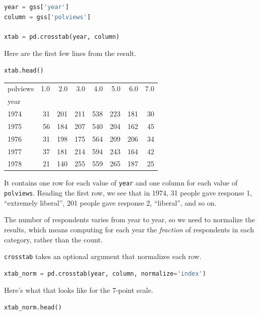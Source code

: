 \begin{lstlisting}[language=Python]
year = gss['year']
column = gss['polviews']

xtab = pd.crosstab(year, column)
\end{lstlisting}

Here are the first few lines from the result.

\begin{lstlisting}[language=Python]
xtab.head()
\end{lstlisting}

\begin{tabular}{lrrrrrrr}
\toprule
polviews &  1.0 &  2.0 &  3.0 &  4.0 &  5.0 &  6.0 &  7.0 \\
year &      &      &      &      &      &      &      \\
\midrule
1974 &   31 &  201 &  211 &  538 &  223 &  181 &   30 \\
1975 &   56 &  184 &  207 &  540 &  204 &  162 &   45 \\
1976 &   31 &  198 &  175 &  564 &  209 &  206 &   34 \\
1977 &   37 &  181 &  214 &  594 &  243 &  164 &   42 \\
1978 &   21 &  140 &  255 &  559 &  265 &  187 &   25 \\
\bottomrule
\end{tabular}

It contains one row for each value of \passthrough{\lstinline!year!} and
one column for each value of \passthrough{\lstinline!polviews!}. Reading
the first row, we see that in 1974, 31 people gave response 1,
``extremely liberal'', 201 people gave response 2, ``liberal'', and so
on.

The number of respondents varies from year to year, so we need to
normalize the results, which means computing for each year the
\emph{fraction} of respondents in each category, rather than the count.

\passthrough{\lstinline!crosstab!} takes an optional argument that
normalizes each row.

\begin{lstlisting}[language=Python]
xtab_norm = pd.crosstab(year, column, normalize='index')
\end{lstlisting}

Here's what that looks like for the 7-point scale.

\begin{lstlisting}[language=Python]
xtab_norm.head()
\end{lstlisting}

